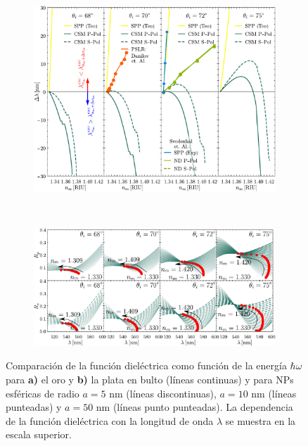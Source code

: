 	\begin{figure}[h!]\centering\hspace*{-1.5em}
	\begin{subfigure}{.01\linewidth}\caption{}\label{sfig:SensThetai}\vspace{11cm}\end{subfigure}
	\begin{subfigure}{.95\linewidth}\hspace*{-1em}
	\includegraphics[width=\linewidth]{2-Resultados/figs/11-SPPCSM/1-comparacion_Au.pdf}
	\end{subfigure}\\ \hspace*{-1.5em}
	\begin{subfigure}{.01\linewidth}\caption{}\label{sfig:SensRpRs}\vspace{6.5cm}\end{subfigure}
	\begin{subfigure}{.95\linewidth}\hspace*{-1em}
	\includegraphics[width=\linewidth]{2-Resultados/figs/11-SPPCSM/2-RpRs}
	\end{subfigure}\vspace*{-.7em}
	\caption{ Comparación de la función dieléctrica como función de la energía $\hbar\omega$ para \textbf{a)} el   oro y \textbf{b)} la plata en bulto (líneas continuas) y para NPs esféricas de radio $a=5$ nm (líneas discontinuas), $a=10$ nm (líneas punteadas) y $a=50$ nm (líneas punto punteadas). La dependencia de la función dieléctrica con la longitud de onda $\lambda$ se muestra en la escala superior.}\label{fig:FinalResults}
	\end{figure}	


